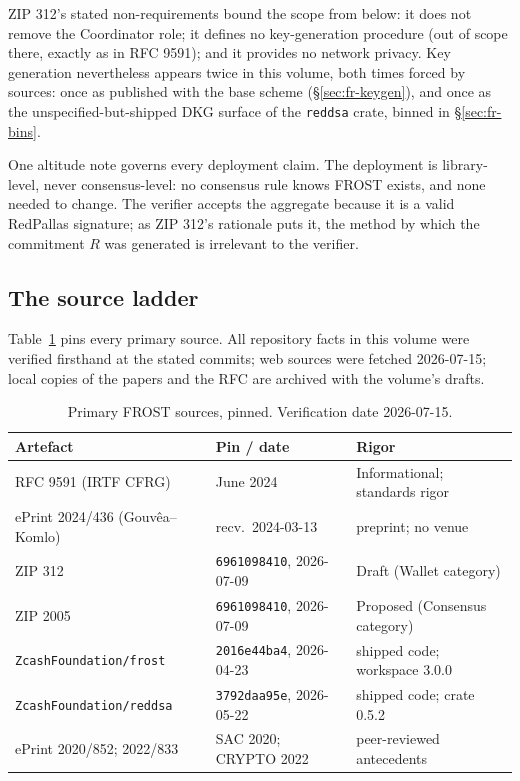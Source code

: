 \documentclass[11pt,a4paper]{article}
\theoremstyle{definition}
\begin{document}
ZIP 312's stated non-requirements bound the scope from below: it does not
remove the Coordinator role; it defines no key-generation procedure (out
of scope there, exactly as in RFC 9591); and it provides no network
privacy. Key generation nevertheless appears twice in this volume, both
times forced by sources: once as published with the base scheme
(\S\ref{sec:fr-keygen}), and once as the unspecified-but-shipped DKG
surface of the \texttt{reddsa} crate, binned in \S\ref{sec:fr-bins}.

One altitude note governs every deployment claim. The deployment is
library-level, never consensus-level: no consensus rule knows FROST
exists, and none needed to change. The verifier accepts the aggregate
because it is a valid RedPallas signature; as ZIP 312's rationale puts
it, the method by which the commitment $R$ was generated is irrelevant to
the verifier.

\subsection{The source ladder}\label{sec:fr-sources}

Table~\ref{tab:fr-sources} pins every primary source. All repository
facts in this volume were verified firsthand at the stated commits; web
sources were fetched 2026-07-15; local copies of the papers and the RFC
are archived with the volume's drafts.

\begin{table}[htbp]
\centering
\small
\begin{tabular}{@{}lll@{}}
\toprule
Artefact & Pin / date & Rigor \\
\midrule
RFC 9591 (IRTF CFRG)
  & June 2024                      & Informational; standards rigor \\
ePrint 2024/436 (Gouv\^ea--Komlo)
  & recv.\ 2024-03-13              & preprint; no venue \\
ZIP 312
  & \texttt{6961098410}, 2026-07-09 & Draft (Wallet category) \\
ZIP 2005
  & \texttt{6961098410}, 2026-07-09 & Proposed (Consensus category) \\
\texttt{ZcashFoundation/frost}
  & \texttt{2016e44ba4}, 2026-04-23 & shipped code; workspace 3.0.0 \\
\texttt{ZcashFoundation/reddsa}
  & \texttt{3792daa95e}, 2026-05-22 & shipped code; crate 0.5.2 \\
ePrint 2020/852; 2022/833
  & SAC 2020; CRYPTO 2022          & peer-reviewed antecedents \\
\bottomrule
\end{tabular}
\caption{Primary FROST sources, pinned. Verification date 2026-07-15.}
\label{tab:fr-sources}
\end{table}
\end{document}
